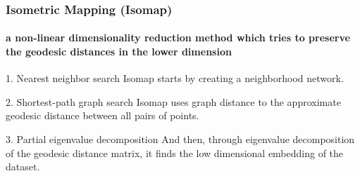 \documentclass{beamer}
\begin{document}
\begin{frame}
  \frametitle{Isometric Mapping (Isomap)}
  \framesubtitle{a non-linear dimensionality reduction method which tries to preserve the geodesic distances in the lower dimension}

  \begin{block}{1. Nearest neighbor search}
    Isomap starts by creating a neighborhood network.
  \end{block}

  \begin{block}{2. Shortest-path graph search}
    Isomap uses graph distance to the approximate geodesic distance between all pairs of points.
  \end{block}

  \begin{block}{3. Partial eigenvalue decomposition}
    And then, through eigenvalue decomposition of the geodesic distance matrix, it finds the low dimensional embedding of the dataset.
  \end{block}
  

\end{frame}
\end{document}
